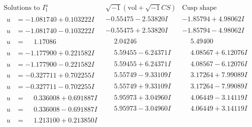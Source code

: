 \documentclass[1p]{elsarticle_modified}
\theoremstyle{definition}
\newcommand{\I}{\sqrt{-1}}
\begin{document}
$$\begin{array}{c|c|c}  
\text{Solutions to }I^u_{1}& \I (\text{vol} + \sqrt{-1}CS) & \text{Cusp shape}\\
 \hline 
\begin{aligned}
u &= -1.081740 + 0.103222 I\end{aligned}
 & -0.55475 - 2.53820 I & -1.85794 + 4.98062 I \\ \hline\begin{aligned}
u &= -1.081740 - 0.103222 I\end{aligned}
 & -0.55475 + 2.53820 I & -1.85794 - 4.98062 I \\ \hline\begin{aligned}
u &= \phantom{-}1.17086\phantom{ +0.000000I}\end{aligned}
 & \phantom{-}2.04246\phantom{ +0.000000I} & \phantom{-}5.49400\phantom{ +0.000000I} \\ \hline\begin{aligned}
u &= -1.177900 + 0.221582 I\end{aligned}
 & \phantom{-}5.59455 - 6.24371 I & \phantom{-}4.08567 + 6.12076 I \\ \hline\begin{aligned}
u &= -1.177900 - 0.221582 I\end{aligned}
 & \phantom{-}5.59455 + 6.24371 I & \phantom{-}4.08567 - 6.12076 I \\ \hline\begin{aligned}
u &= -0.327711 + 0.702255 I\end{aligned}
 & \phantom{-}5.55749 - 9.33109 I & \phantom{-}3.17264 + 7.99089 I \\ \hline\begin{aligned}
u &= -0.327711 - 0.702255 I\end{aligned}
 & \phantom{-}5.55749 + 9.33109 I & \phantom{-}3.17264 - 7.99089 I \\ \hline\begin{aligned}
u &= \phantom{-}0.336008 + 0.691887 I\end{aligned}
 & \phantom{-}5.95973 + 3.04960 I & \phantom{-}4.06449 - 3.14119 I \\ \hline\begin{aligned}
u &= \phantom{-}0.336008 - 0.691887 I\end{aligned}
 & \phantom{-}5.95973 - 3.04960 I & \phantom{-}4.06449 + 3.14119 I \\ \hline\begin{aligned}
u &= \phantom{-}1.213100 + 0.213850 I\end{aligned}

\end{array}$$
\end{document}
